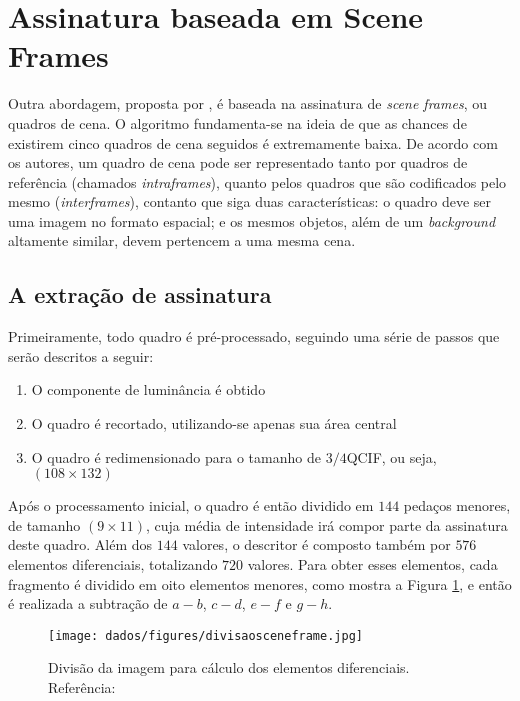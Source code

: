 \section{Assinatura baseada em Scene Frames}


Outra abordagem, proposta por \cite{mao2015sceneframe}, é baseada na assinatura de \textit{scene frames}, ou quadros de cena. O algoritmo fundamenta-se na ideia de que as chances de existirem cinco quadros de cena seguidos é extremamente baixa. De acordo com os autores, um quadro de cena pode ser representado tanto por quadros de referência (chamados \textit{intraframes}), quanto pelos quadros que são codificados pelo mesmo (\textit{interframes}), contanto que siga duas características: o quadro deve ser uma imagem no formato espacial; e os mesmos objetos, além de um \textit{background} altamente similar, devem pertencem a uma mesma cena.

\subsection{A extração de assinatura}

Primeiramente, todo quadro é pré-processado, seguindo uma série de passos que serão descritos a seguir:

\begin{enumerate}
	\item O componente de luminância é obtido
   	\item O quadro é recortado, utilizando-se apenas sua área central
    \item O quadro é redimensionado para o tamanho de $3/4$QCIF, ou seja, $(108\times132)$
\end{enumerate}

Após o processamento inicial, o quadro é então dividido em $144$ pedaços menores, de tamanho $(9\times11)$, cuja média de intensidade irá compor parte da assinatura deste quadro. Além dos $144$ valores, o descritor é composto também por $576$ elementos diferenciais, totalizando $720$ valores. Para obter esses elementos, cada fragmento é dividido em oito elementos menores, como mostra a Figura \ref{fig:divsceneframe}, e então é realizada a subtração de $a - b$, $c - d$, $e - f$ e $g - h$.

\begin{figure}[h]
	\centering
    \label{fig:divsceneframe}
	\texttt{[image: dados/figures/divisaosceneframe.jpg]}
    \caption{Divisão da imagem para cálculo dos elementos diferenciais. Referência: \cite{mao2015sceneframe}}
\end{figure}

